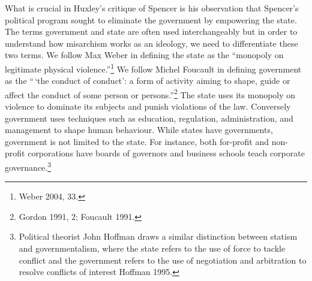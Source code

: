 \documentclass[12pt,]{article}
\begin{document}
What is crucial in Huxley's critique of Spencer is his observation that
Spencer's political program sought to eliminate the government by
empowering the state. The terms government and state are often used
interchangeably but in order to understand how misarchism works as an
ideology, we need to differentiate these two terms. We follow Max Weber
in defining the state as the ``monopoly on legitimate physical
violence.''\footnote{Weber 2004, 33. } We follow Michel Foucault in
defining government as the ``\,`the conduct of conduct': a form of
activity aiming to shape, guide or affect the conduct of some person or
persons.''\footnote{Gordon 1991, 2; Foucault 1991. } The state uses its
monopoly on violence to dominate its subjects and punish violations of
the law. Conversely government uses techniques such as education,
regulation, administration, and management to shape human behaviour.
While states have governments, government is not limited to the state.
For instance, both for-profit and non-profit corporations have boards of
governors and business schools teach corporate governance.\footnote{Political
  theorist John Hoffman draws a similar distinction between statism and
  governmentalism, where the state refers to the use of force to tackle
  conflict and the government refers to the use of negotiation and
  arbitration to resolve conflicts of interest Hoffman 1995.}
\end{document}
